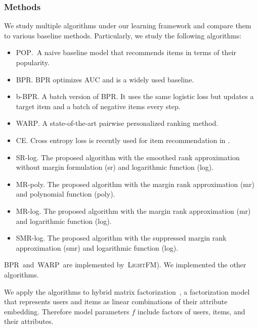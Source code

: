 \documentclass[letterpaper]{article}
\newcommand{\lightfm}{\textsc{LightFM}}
\newcommand{\pop}{\textsc{POP}}
\newcommand{\awarp}{\textsc{WARP}}
\newcommand{\bbpr}{b-BPR}
\newcommand{\bpr}{BPR}
\begin{document}
\subsubsection{Methods}
We study multiple algorithms under our learning framework and compare them to various baseline methods. Particularly, we study the following algorithms:

\begin{itemize}
\item \pop.~A naive baseline model that recommends items in terms of their popularity.
\item \bpr\cite{rendle2009bpr}. BPR optimizes AUC and is a widely used baseline.
\item \bbpr. A batch version of BPR. It uses the same logistic loss but updates a target item and a batch of negative items every step.%
\item \awarp\cite{weston2010large,hong2013co}. A state-of-the-art pairwise personalized ranking method.
\item CE. Cross entropy loss is recently used for item recommendation in \cite{hidasi2015session,covington2016deep}. %
\item SR-log. The proposed algorithm with the smoothed rank approximation without margin formulation (sr) and logarithmic function (log).
\item MR-poly. The proposed algorithm with the margin rank approximation (mr) and polynomial function (poly).
\item MR-log. The proposed algorithm with the margin rank approximation (mr) and logarithmic function (log).
\item SMR-log. The proposed algorithm with the suppressed margin rank approximation (smr) and logarithmic function (log).
\end{itemize}

\bpr~and~\awarp~are implemented by~\lightfm \cite{kula_metadata_2015}). We implemented the other algorithms.

We apply the algorithms to hybrid matrix factorization~\cite{shmueli2012care}, a factorization model that represents users and items as linear combinations of their attribute embedding. Therefore model parameters $f$ include factors of users, items, and their attributes.
\end{document}
